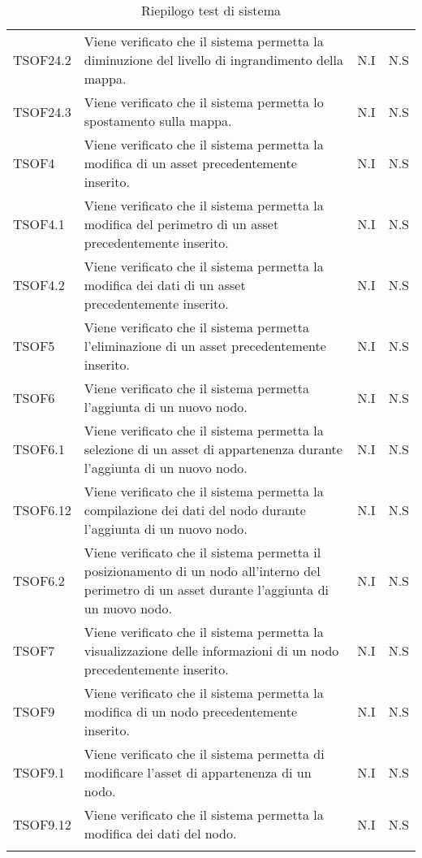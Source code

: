 \begin{longtable}{p{1.5cm}!{\VRule[1pt]}p{5cm}!{\VRule[1pt]}p{1cm}!{\VRule[1pt]}p{1cm}}
		TSOF24.2 & Viene verificato che il sistema permetta la diminuzione del livello di ingrandimento della mappa. & N.I & N.S \\ 
		TSOF24.3 & Viene verificato che il sistema permetta lo spostamento sulla mappa. & N.I & N.S \\ 
		TSOF4 & Viene verificato che il sistema permetta la modifica di un asset precedentemente inserito. & N.I & N.S \\ 
		TSOF4.1 & Viene verificato che il sistema permetta la modifica del perimetro di un asset precedentemente inserito. & N.I & N.S \\ 
		TSOF4.2 & Viene verificato che il sistema permetta la modifica dei dati di un asset precedentemente inserito. & N.I & N.S \\ 
		TSOF5 & Viene verificato che il sistema permetta l'eliminazione di un asset precedentemente inserito. & N.I & N.S \\ 
		TSOF6 & Viene verificato che il sistema permetta l'aggiunta di un nuovo nodo. & N.I & N.S \\ 
		TSOF6.1 & Viene verificato che il sistema permetta la selezione di un asset di appartenenza durante l'aggiunta di un nuovo nodo. & N.I & N.S \\ 
		TSOF6.12 & Viene verificato che il sistema permetta la compilazione dei dati del nodo durante l'aggiunta di un nuovo nodo. & N.I & N.S \\ 
		TSOF6.2 & Viene verificato che il sistema permetta il posizionamento di un nodo all'interno del perimetro di un asset durante l'aggiunta di un nuovo nodo. & N.I & N.S \\ 
		TSOF7 & Viene verificato che il sistema permetta la visualizzazione delle informazioni di un nodo precedentemente inserito. & N.I & N.S \\ 
		TSOF9 & Viene verificato che il sistema permetta la modifica di un nodo precedentemente inserito. & N.I & N.S \\ 
		TSOF9.1 & Viene verificato che il sistema permetta di modificare l'asset di appartenenza di un nodo. & N.I & N.S \\ 
		TSOF9.12 & Viene verificato che il sistema permetta la modifica dei dati del nodo. & N.I & N.S \\ 
		\caption{Riepilogo test di sistema}
	\end{longtable}	
		
